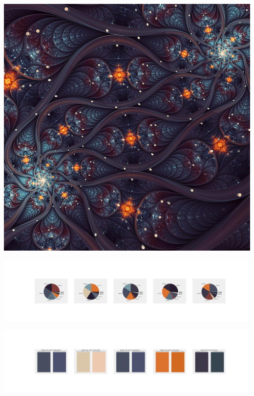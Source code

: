 \documentclass[11pt]{article}
\begin{document}
\begin{landscape}
    \begin{center}
    \includegraphics[width=\textwidth]{./nbimg/file (442).jpg}
    \end{center}

    \begin{center}
    \includegraphics[width=250mm]{./nbimg/pie-381.jpg}
    \end{center}

    \begin{center}
    \includegraphics[width=250mm]{./nbimg/peak-381.jpg}
    \end{center}
    


\end{landscape}
\end{document}
